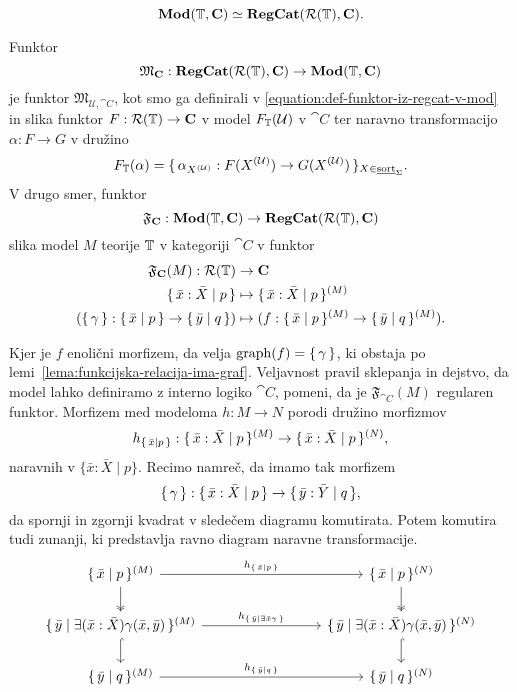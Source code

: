 \documentclass[../kategoricna_logika.tex]{subfiles}
\begin{document}
$$\mathbf{Mod}(\mathbb{T}, {\operatorname{\mathbf{C}}}) \simeq {\operatorname{\mathbf{RegCat}}}(\mathcal{R}(\mathbb{T}), {\operatorname{\mathbf{C}}}).$$
\begin{definicija}\label{def:ekvivalenca-reg-logike-reg-kategorij}
  Funktor
$$\mathfrak{M}_{{\operatorname{\mathbf{C}}}} : {\operatorname{\mathbf{RegCat}}}(\mathcal{R}(\mathbb{T}), {\operatorname{\mathbf{C}}}) \to \mathbf{Mod}(\mathbb{T}, {\operatorname{\mathbf{C}}})$$
je funktor $\mathfrak{M}_{\mathcal{U}, \cat{C}}$, kot smo ga definirali
v \eqref{equation:def-funktor-iz-regcat-v-mod} in slika funktor
$F : \mathcal{R}(\mathbb{T}) \to {\operatorname{\mathbf{C}}}$ v model $F_{\mathbb{T}}(\mathcal{U})$ v
$\cat{C}$ ter naravno transformacijo $\alpha : F \to G$ v družino
$$F_{\mathbb{T}}(\alpha) = \lbrace\,\alpha_{{X}^{(\mathcal{U})}} : F({X}^{(\mathcal{U})}) \to G({X}^{(\mathcal{U})})\,\rbrace_{X \in \underline{\mathrm{sort}}_{\Sigma}}.$$
V drugo smer, funktor
$$\mathfrak{F}_{{\operatorname{\mathbf{C}}}} : \mathbf{Mod}(\mathbb{T}, {\operatorname{\mathbf{C}}}) \to {\operatorname{\mathbf{RegCat}}}(\mathcal{R}(\mathbb{T}), {\operatorname{\mathbf{C}}})$$
slika model $M$ teorije $\mathbb{T}$ v kategoriji $\cat{C}$ v funktor
\begin{align*}
  \mathfrak{F}_{{\operatorname{\mathbf{C}}}}(M) : \mathcal{R}(\mathbb{T}) &\to {\operatorname{\mathbf{C}}}\\
  \lbrace\,\bar{x}:\bar{X} \mid  p\,\rbrace &\mapsto \lbrace\,\bar{x}:\bar{X} \mid  p\,\rbrace^{(M)} \\
  (\lbrace\,\gamma\,\rbrace : \lbrace\,\bar{x} \mid  p\,\rbrace \to \lbrace\,\bar{y} \mid  q\,\rbrace)
                                              &\mapsto (f : \lbrace\,\bar{x} \mid  p\,\rbrace^{(M)} \to \lbrace\,\bar{y} \mid  q\,\rbrace^{(M)}).
\end{align*}
\end{definicija}
Kjer je $f$ enolični morfizem, da velja $\mathrm{graph}(f) = \lbrace\,\gamma\,\rbrace$, ki
obstaja po lemi~\ref{lema:funkcijska-relacija-ima-graf}.
Veljavnost pravil sklepanja in dejstvo, da model lahko definiramo z
interno logiko $\cat{C}$, pomeni, da je $\mathfrak{F}_{\cat{C}}(M)$
regularen funktor.  Morfizem med modeloma $h : M \to N$ porodi družino
morfizmov
$$h_{\lbrace\,\bar{x}\mid  p\,\rbrace} : \lbrace\,\bar{x}:\bar{X} \mid  p\,\rbrace^{(M)} \to \lbrace\,\bar{x}:\bar{X} \mid  p\,\rbrace^{(N)},$$
naravnih v $\{\bar{x}:\bar{X} \mid p\}$. Recimo namreč, da imamo tak morfizem
$$\lbrace\,\gamma\,\rbrace : \lbrace\,\bar{x}:\bar{X} \mid  p\,\rbrace \to \lbrace\,\bar{y}:\bar{Y} \mid  q\,\rbrace,$$
da spornji in zgornji kvadrat v sledečem diagramu komutirata.
Potem komutira tudi zunanji, ki predstavlja ravno diagram naravne transformacije.
\begin{equation*}
  \begin{tikzcd}[column sep=3cm]
    {\set{\bar{x}\mid  p}^{(M)}} \ar[d, two heads] \ar[r, "{h_{\set{\bar{x} \mid  p}}}"] &
    {\set{\bar{x} \mid  p}^{(N)}} \ar[d, two heads] \\
    \set{\bar{y} \mid  \exists (\bar{x}:\bar{X}) \gamma(\bar{x}, \bar{y})}^{(M)}
    \ar[d, hook] \ar[r, "{h_{\set{\bar{y} \mid  \exists \bar{x} \gamma}}}"] &
    \set{\bar{y}\mid  \exists (\bar{x}:\bar{X}) \gamma(\bar{x}, \bar{y})}^{(N)} \ar[d, hook] \\
    \set{\bar{y} \mid  q}^{(M)} \ar[r,
    "{h_{\set{\bar{y} \mid  q}}}"] & \set{\bar{y} \mid  q}^{(N)}
  \end{tikzcd}
\end{equation*}
\end{document}
